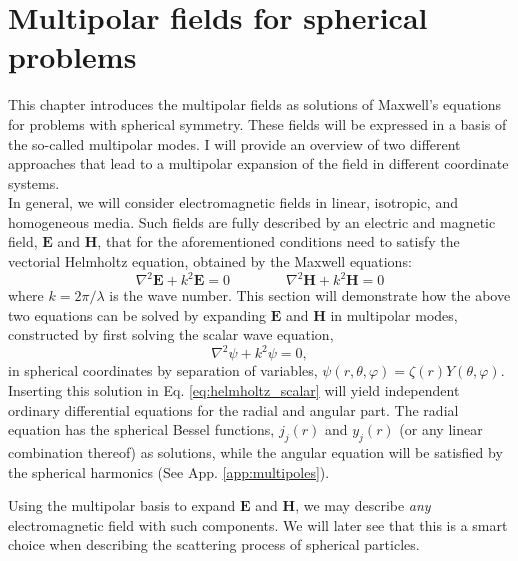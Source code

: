\section{Multipolar fields for spherical problems}\label{sec:2}

This chapter introduces the multipolar fields as solutions of Maxwell's equations for problems with spherical symmetry. These fields will be expressed in a basis of the so-called multipolar modes. I will provide an overview of two different approaches that lead to a multipolar expansion of the field in different coordinate systems.\\
In general, we will consider electromagnetic fields in linear, isotropic, and homogeneous media. Such fields are fully described by an electric and magnetic field, $\mathbf{E}$ and $\mathbf{H}$, that for the aforementioned conditions need to satisfy the vectorial Helmholtz equation, obtained by the Maxwell equations:
\begin{equation}
    \label{eq:helmholtz}
    \nabla^2\mathbf{E}+k^2\mathbf{E}=0 \qquad \qquad \nabla^2\mathbf{H}+k^2\mathbf{H}=0
\end{equation}
where $k=2\pi/\lambda$ is the wave number.
This section will demonstrate how the above two equations can be solved by expanding $\mathbf{E}$ and $\mathbf{H}$ in multipolar modes, constructed by first solving the scalar wave equation,
\begin{equation}\label{eq:helmholtz_scalar}
    \nabla^2\psi+k^2\psi=0,
\end{equation}
in spherical coordinates by separation of variables, $\psi(r,\theta,\varphi)=\zeta(r)Y(\theta,\varphi).$\\
Inserting this solution in Eq. \ref{eq:helmholtz_scalar} will yield independent ordinary differential equations for the radial and angular part. The radial equation has the spherical Bessel functions, $j_j(r)$ and $y_j(r)$ (or any linear combination thereof) as solutions, while the angular equation will be satisfied by the spherical harmonics (See App. \ref{app:multipoles}). 



Using the multipolar basis to expand $\mathbf{E}$ and $\mathbf{H}$, we may describe \textit{any} electromagnetic field with such components. We will later see that this is a smart choice when describing the scattering process of spherical particles.

